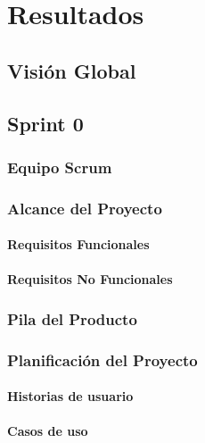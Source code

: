 \chapter{Resultados}
\label{cap:Resultados}

\section{Visión Global}
\label{sec:VisionGlobal}

\section{Sprint 0}
\label{sec:Sprint0}

\subsection{Equipo Scrum}
\label{sec:EquipoScrum}

\subsection{Alcance del Proyecto}
\label{sec:Alcance}

\subsubsection{Requisitos Funcionales}
\label{sec:RequisitosFuncionales}

\subsubsection{Requisitos No Funcionales}
\label{sec:RequisitosNoFuncionales}

\subsection{Pila del Producto}
\label{sec:PilaProducto}

\subsection{Planificación del Proyecto}
\label{sec:Planificacion}

\subsubsection{Historias de usuario}
\label{sec:HistoriasUsuario}

\subsubsection{Casos de uso}
\label{sec:CasosUso}

